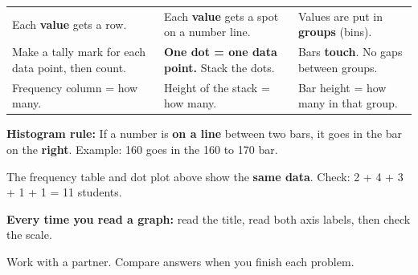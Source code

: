 \documentclass[11pt]{article}
\begin{document}
\vspace{0.4em}
\renewcommand{\arraystretch}{1.35}
\begin{tabular}{|>{\raggedright}p{2.1in}|>{\raggedright}p{2.1in}|>{\raggedright\arraybackslash}p{2.1in}|}
\hline
Each \textbf{value} gets a row. &
Each \textbf{value} gets a spot on a number line. &
Values are put in \textbf{groups} (bins). \\
Make a tally mark for each data point, then count. &
\textbf{One dot = one data point.} Stack the dots. &
Bars \textbf{touch}. No gaps between groups. \\
Frequency column = how many. &
Height of the stack = how many. &
Bar height = how many in that group. \\
\hline
\end{tabular}

\vspace{0.8em}
\textbf{Histogram rule:} If a number is \textbf{on a line} between two bars, it goes in the bar on the \textbf{right}.
Example: 160 goes in the 160 to 170 bar.

\vspace{0.4em}
The frequency table and dot plot above show the \textbf{same data}. Check: 2 + 4 + 3 + 1 + 1 = 11 students.

\vspace{0.4em}
\textbf{Every time you read a graph:} read the title, read both axis labels, then check the scale.

\vspace{0.4em}
Work with a partner. Compare answers when you finish each problem.
\end{document}
